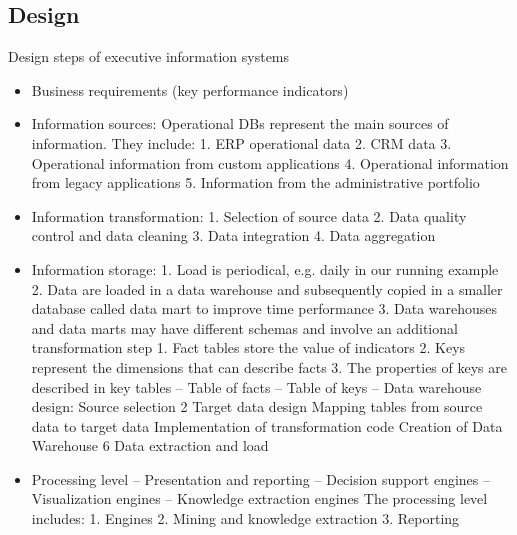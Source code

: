 \subsection{Design}
Design steps of executive information systems
\begin{itemize}

\item Business requirements (key performance indicators)
\item Information sources: Operational DBs represent the main sources of
                    information. They include:
                    1. ERP operational data
                    2. CRM data
                    3. Operational information from custom
                    applications
                    4. Operational information from legacy applications
                    5. Information from the administrative portfolio

                    \item Information transformation: 1. Selection of source data
        2. Data quality control and data cleaning
        3. Data integration
        4. Data aggregation
\item Information storage: 1. Load is periodical, e.g. daily in our running example
2. Data are loaded in a data warehouse and subsequently copied in a smaller
database called data mart to improve time performance
3. Data warehouses and data marts may have different schemas and involve
an additional transformation step
1. Fact tables store the value of indicators
2. Keys represent the dimensions that can describe facts
3. The properties of keys are described in key tables
– Table of facts
– Table of keys
– Data warehouse design: Source selection 2 Target data design
Mapping tables from source
data to target data
Implementation of
transformation code 
Creation of Data Warehouse
6 Data extraction and load

\item Processing level
– Presentation and reporting
– Decision support engines
– Visualization engines
– Knowledge extraction engines
The processing level includes:
1. Engines
2. Mining and knowledge
extraction
3. Reporting

\end{itemize}
